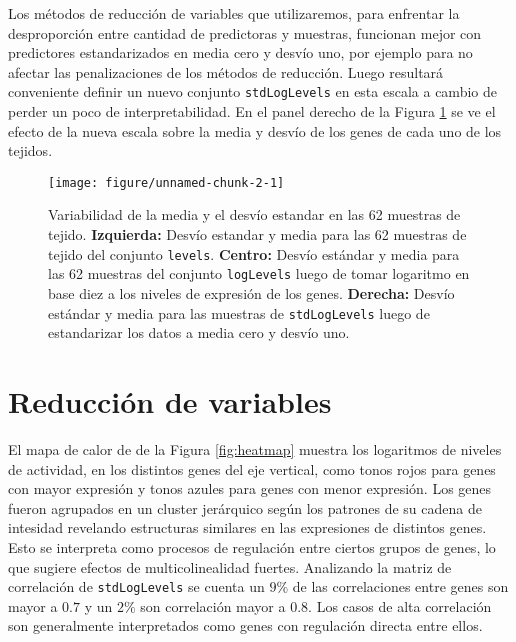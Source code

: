 \documentclass[a4paper]{article}\usepackage[]{graphicx}\usepackage[]{color}
\makeatletter
\def\maxwidth{ %
  \ifdim\Gin@nat@width>\linewidth
    \linewidth
  \else
    \Gin@nat@width
  \fi
}
\newenvironment{knitrout}{}{} %
\newcommand*{\torange}{\textcolor{BurntOrange}}
\makeatother
\begin{document}
Los métodos de reducción de variables que utilizaremos, para enfrentar la desproporción entre cantidad de predictoras y muestras, funcionan mejor con predictores estandarizados en media cero y desvío uno, por ejemplo para no afectar las penalizaciones de los métodos de reducción. Luego resultará conveniente definir un nuevo conjunto \torange{\texttt{stdLogLevels}} en esta escala a cambio de perder un poco de interpretabilidad. En el panel derecho de la Figura \ref{fig:variabilidad} se ve el efecto de la nueva escala sobre la media y desvío de los genes de cada uno de los tejidos.

\begin{figure}[h]
\caption{Variabilidad de la media y el desvío estandar en las 62 muestras de tejido. \textbf{Izquierda:} Desvío estandar y media para las 62 muestras de tejido del conjunto \torange{\texttt{levels}}. \textbf{Centro:} Desvío estándar y media para las 62 muestras del conjunto \torange{\texttt{logLevels}} luego de tomar logaritmo en base diez a los niveles de expresión de los genes. \textbf{Derecha:} Desvío estándar y media para las muestras de \torange{\texttt{stdLogLevels}} luego de estandarizar los datos a media cero y desvío uno.}

\label{fig:variabilidad}
\begin{knitrout}
\color{fgcolor}

{\centering \texttt{[image: figure/unnamed-chunk-2-1]} 

}



\end{knitrout}
\end{figure}


\section{Reducción de variables}

El mapa de calor de de la Figura \ref{fig:heatmap} muestra los logaritmos de niveles de actividad, en los distintos genes del eje vertical, como tonos rojos para genes con mayor expresión y tonos azules para genes con menor expresión. Los genes fueron agrupados en un cluster jerárquico según los patrones de su cadena de intesidad revelando estructuras similares en las expresiones de distintos genes. Esto se interpreta como procesos de regulación entre ciertos grupos de genes, lo que sugiere efectos de multicolinealidad fuertes. Analizando la matriz de correlación de \torange{\texttt{stdLogLevels}} se cuenta un $9\%$ de las correlaciones entre genes son mayor a $0.7$ y un $2\%$ son correlación mayor a $0.8$. Los casos de alta correlación son generalmente interpretados como genes con regulación directa entre ellos. 
\end{document}

